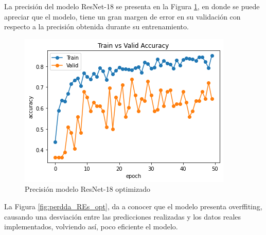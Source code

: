 La precisión del modelo ResNet-18 se presenta en la Figura \ref{fig:preci_RES_OPT}, en donde se puede apreciar que el modelo, tiene un gran margen de error en su validación con respecto a la precisión obtenida durante su entrenamiento.

\begin{figure}[ht]
	\centering
	\includegraphics[scale=0.6]{Figs/512.png}
	\caption{Precisión modelo ResNet-18 optimizado}
	\label{fig:preci_RES_OPT}
\end{figure}

La Figura \ref{fig:perdda_REs_opt}, da a conocer que el modelo presenta overffiting, causando una desviación entre las predicciones realizadas y los datos reales implementados, volviendo así, poco eficiente el modelo.	

